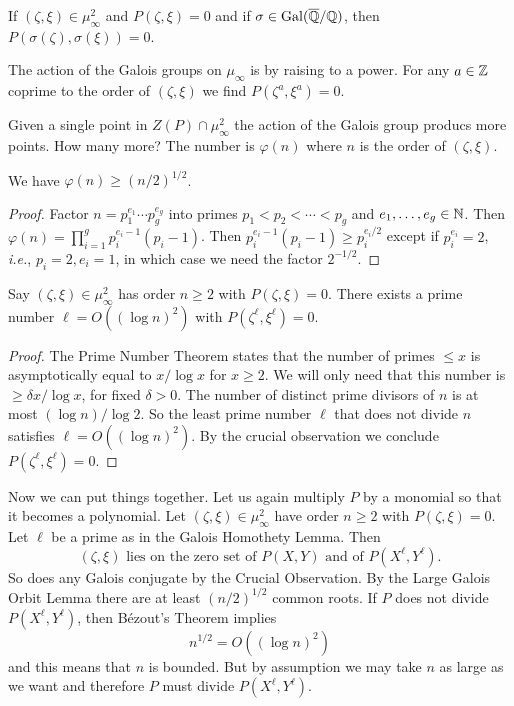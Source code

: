 \begin{crucial}
  If $(\zeta,\xi)\in \mu_\infty^2$ and $P(\zeta,\xi)=0$ and if
  $\sigma\in \mathrm{Gal}({\overline{\mathbb{Q}}}/{\mathbb{Q}})$, then
  $P(\sigma(\zeta),\sigma(\xi))=0$.

  The action of the Galois groups on $\mu_\infty$ is by raising to a
  power. For any $a\in{\mathbb{Z}}$ coprime to the order of $(\zeta,\xi)$  
  we find $P(\zeta^a,\xi^a)=0$. 
\end{crucial}

Given a single point in $Z(P)\cap\mu_\infty^2$ the action of the
Galois group producs more points. How many more? The number is
$\varphi(n)$ where $n$ is the order of $(\zeta,\xi)$. 

\begin{lemma}
  \label{lem:lgo}
  We have $\varphi(n) \ge (n/2)^{1/2}$. 
\end{lemma}
\begin{proof}
  Factor $n=p_1^{e_1}\cdots p_g^{e_g}$ into primes $p_1<p_2<\cdots <
  p_g$ and $e_1,\ldots,e_g\in{\mathbb{N}}$. Then $\varphi(n) = \prod_{i=1}^g
  p_i^{e_i-1}(p_i-1)$. Then $p_i^{e_i-1}(p_i-1)\ge p_i^{e_i/2}$ except
  if $p_i^{e_i}=2$, \textit{i.e.}, $p_i=2,e_i=1$, in which case we
  need the factor $2^{-1/2}$. 
\end{proof}


\begin{lemma}
  Say $(\zeta,\xi)\in \mu_\infty^2$ has order $n\ge 2$
  with $P(\zeta,\xi)=0$. There exists a prime number $\ell=O((\log
  n)^2)$ with $P(\zeta^\ell,\xi^\ell)=0$. 
\end{lemma}
\begin{proof}
  The Prime Number Theorem states that the number of primes $\le x$ is
  asymptotically equal to $x/\log x$ for $x\ge 2$.
  We will only need that this number
  is $\ge \delta x/\log x$, for fixed $\delta >0$. 
  The number of
  distinct prime divisors of $n$ is at most $(\log n)/\log 2$.
  So the least prime number $\ell$ that does not divide $n$ satisfies $\ell =
  O((\log n)^2)$. By the crucial observation we conclude
  $P(\zeta^\ell,\xi^\ell)=0$. 
\end{proof}

Now we can put things together. Let us again multiply $P$ by a
monomial so that it becomes a polynomial.
Let $(\zeta,\xi)\in \mu_\infty^2$ have order $n\ge 2$ with
$P(\zeta,\xi)=0$. Let $\ell$ be a prime as in the Galois Homothety
Lemma.
Then
\begin{equation}
  \label{eq:intersectionGm}
  (\zeta,\xi)\text{ lies on the zero set of $P(X,Y)$ and of 
    $P(X^{\ell},Y^{\ell})$}.
\end{equation}
So does any Galois
conjugate by the Crucial Observation.
By the Large Galois Orbit Lemma there are at least
$(n/2)^{1/2}$ common roots. If $P$ does not divide $P(X^\ell,Y^\ell)$,
then B\'ezout's Theorem implies
\begin{equation*}
  n^{1/2} = O((\log n)^2)
\end{equation*}
and this means that $n$ is bounded. But by assumption we may take $n$
as large as we want and therefore $P$ must divide $P(X^\ell,Y^\ell)$.

